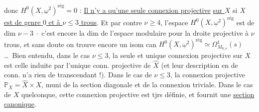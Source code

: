 donc $H^0(X,\underline\omega^2)^{\mathrm{rég}}=0$ :
\uline{Il n'y a qu'une seule connexion projective}  \uline{sur $X$} si
\uline{$X$ est de genre $0$ et à $\nu\leq3$ trous}. Et
par contre $\nu\geq4$, l'espace $H^0(X,\underline\omega^2)^{\mathrm{rég}}$ est
de dim $\nu-3$ -- c'est encore la dim de
l'espace modulaire pour la droite projective
à $\nu$ trous, et sans doute on trouve
encore un isom can $H^0(X,\underline\omega^2)^{\mathrm{rég}}
\simeq\Omega^1_{M_{0,\nu}}(s)$ \ldots\ Bien entendu, dans le
cas $\nu\leq3$, la seule et unique connexion
projective sur $X$ est celle induite par
l'unique conn. projective de $\widehat X$ (et leur
description en  de conn. n'a rien
de transcendant !). Dans le cas de $\nu\leq3$,
 la connexion projective  
$\mathbb P_X=\widehat X\times X$, muni de la section diagonale  et
de la connexion triviale. Dans le cas
de $X$ quelconque,  cette
connexion projective est tjrs définie, et
fournit une \uline{section canonique}.

